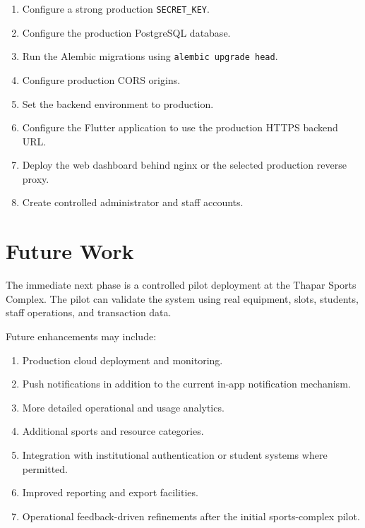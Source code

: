 \documentclass[12pt,a4paper,oneside]{report}
\begin{document}
\begin{enumerate}
    \item Configure a strong production \texttt{SECRET\_KEY}.
    \item Configure the production PostgreSQL database.
    \item Run the Alembic migrations using \texttt{alembic upgrade head}.
    \item Configure production CORS origins.
    \item Set the backend environment to production.
    \item Configure the Flutter application to use the production HTTPS backend URL.
    \item Deploy the web dashboard behind nginx or the selected production reverse proxy.
    \item Create controlled administrator and staff accounts.
\end{enumerate}

\section{Future Work}

The immediate next phase is a controlled pilot deployment at the Thapar Sports Complex. The pilot can validate the system using real equipment, slots, students, staff operations, and transaction data.

Future enhancements may include:

\begin{enumerate}
    \item Production cloud deployment and monitoring.
    \item Push notifications in addition to the current in-app notification mechanism.
    \item More detailed operational and usage analytics.
    \item Additional sports and resource categories.
    \item Integration with institutional authentication or student systems where permitted.
    \item Improved reporting and export facilities.
    \item Operational feedback-driven refinements after the initial sports-complex pilot.
\end{enumerate}

\end{document}
